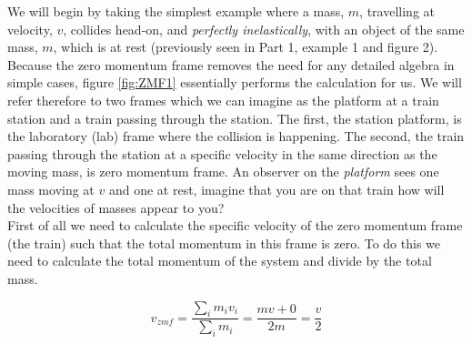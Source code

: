 \noindent We will begin by taking the simplest example where a mass, $m$, travelling at velocity, $v$, collides head-on, and \emph{perfectly inelastically}, with an object of the same mass, $m$, which is at rest (previously seen in  Part 1, example 1 and figure 2).\\

\noindent Because the zero momentum frame removes the need for any detailed algebra in simple cases, figure \ref{fig:ZMF1} essentially performs the calculation for us.  We will refer therefore to two frames which we can imagine as the platform at a train station and a train passing through the station.
The first, the station platform, is the laboratory (lab) frame where the collision is happening.  The second, the train passing through the station at a specific velocity in the same direction as the moving mass, is zero momentum frame.  An observer on the \emph{platform} sees one mass moving at $v$ and one at rest,  imagine that you are on that train how will the velocities of masses appear to you? \\

\noindent First of all we need to calculate the specific velocity of the zero momentum frame (the train) such that the total momentum in this frame is zero.  To do this we need to calculate the total momentum of the system and divide by the total mass.

\begin{equation}
v_{zmf}=\frac{\sum_i{m_i v_i}}{\sum_i m_i} = \frac{mv+0}{2m} = \frac{v}{2}
\end{equation}

